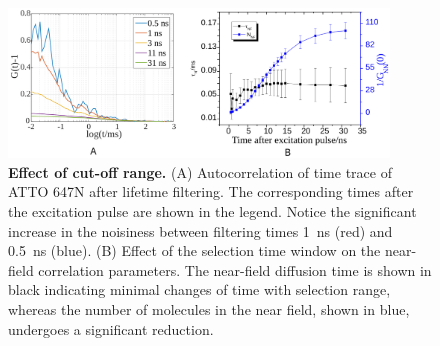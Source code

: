 \begin{figure}%
  \centering
  \includegraphics[width=0.9\textwidth]{cutoff_effect}
  \makeatletter
  \renewcommand{\fnum@figure}{\figurename~S\thefigure}
  \makeatother{}
  \caption{\textbf{Effect of cut-off range.} (A) Autocorrelation of time trace of ATTO 647N after lifetime filtering.
  The corresponding times after the excitation pulse are shown in the legend.
  Notice the significant increase in the noisiness between filtering times \SI{1}{\ns} (red) and \SI{0.5}{\ns} (blue).
  (B) Effect of the selection time window on the near-field correlation parameters.
  The near-field diffusion time is shown in black indicating minimal changes of time with selection range, whereas the number of molecules in the near field, shown in blue, undergoes a significant reduction.}
  \label{SIfig:cutoff-effect}
\end{figure}

